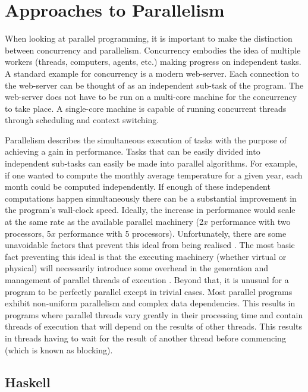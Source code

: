 \section{Approaches to Parallelism}

When looking at parallel programming, it is important to make the distinction
between concurrency and parallelism.  Concurrency embodies the idea of multiple
workers (threads, computers, agents, etc.) making progress on independent
tasks. A standard example for concurrency is a modern web-server. Each
connection to the web-server can be thought of as an independent sub-task of
the program. The web-server does not have to be run on a multi-core machine for
the concurrency to take place. A single-core machine is capable of running
concurrent threads through scheduling and context switching.

Parallelism describes the simultaneous execution of tasks with the purpose of
achieving a gain in performance. Tasks that can be easily divided into
independent sub-tasks can easily be made into parallel algorithms. For example,
if one wanted to compute the monthly average temperature for a given year, each
month could be computed independently.  If enough of these independent
computations happen simultaneously there can be a substantial improvement in
the program's wall-clock speed. Ideally, the increase in performance would
scale at the same rate as the available parallel machinery (2$x$ performance
with two processors, 5$x$ performance with 5 processors). Unfortunately, there
are some unavoidable factors that prevent this ideal from being realised
\citep{hughes:thesis,HistoryOfHaskell,PFPAnIntro}. The most basic fact
preventing this ideal is that the executing machinery (whether virtual or
physical) will necessarily introduce some overhead in the generation and
management of parallel threads of execution \citep{PeytonJones:IFL}. Beyond
that, it is unusual for a program to be perfectly parallel except in trivial
cases. Most parallel programs exhibit non-uniform parallelism and complex data
dependencies. This results in programs where parallel threads vary greatly in
their processing time and contain threads of execution that will depend on the
results of other threads. This results in threads having to wait for the result
of another thread before commencing (which is known as blocking).

 \subsection{Haskell}

